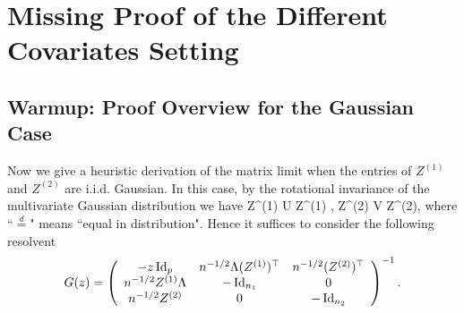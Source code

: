 \section{Missing Proof of the Different Covariates Setting}\label{sec_maintools}

%

\subsection{Warmup: Proof Overview for the Gaussian Case}
Now we give a heuristic derivation of the matrix limit when the entries of $Z^{(1)}$ and $Z^{(2)}$ are i.i.d. Gaussian. In this case,
by the rotational invariance of the multivariate Gaussian distribution we have
\be\label{eq in Gauss} Z^{(1)} U\Lambda {} Z^{(1)} \Lambda, \quad Z^{(2)} V  Z^{(2)},\ee
where ``$\stackrel{d}{=}$" means ``equal in distribution". Hence it suffices to consider the following resolvent
 \begin{equation} \label{resolv Gauss1}
   G(z)= \left( {\begin{array}{*{20}c}
   { -z\id_{p} } & n^{-1/2}\Lambda (Z^{(1)})^\top & n^{-1/2} (Z^{(2)})^\top  \\
   {n^{-1/2} Z^{(1)} \Lambda  } & {-\id_{n_1}} & 0 \\
   {n^{-1/2} Z^{(2)}} & 0 & {-\id_{n_2}}
   \end{array}} \right)^{-1}.
 \end{equation}

